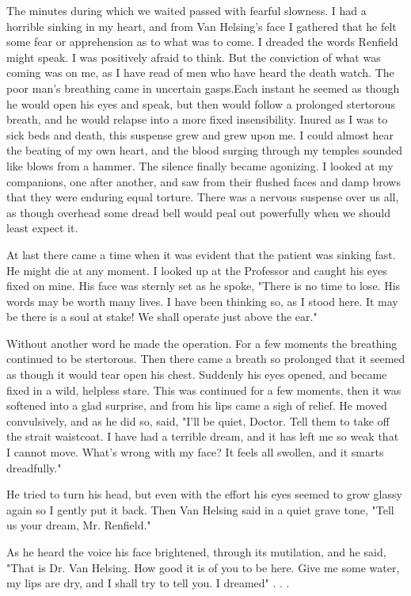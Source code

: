 The minutes during which we waited passed with fearful slowness. I had a horrible sinking in my heart, and from Van Helsing's face I gathered that he felt some fear or apprehension as to what was to come. I dreaded the words Renfield might speak. I was positively afraid to think. But the conviction of what was coming was on me, as I have read of men who have heard the death watch. The poor man's breathing came in uncertain gasps.Each instant he seemed as though he would open his eyes and speak, but then would follow a prolonged stertorous breath, and he would relapse into a more fixed insensibility. Inured as I was to sick beds and death, this suspense grew and grew upon me. I could almost hear the beating of my own heart, and the blood surging through my temples sounded like blows from a hammer. The silence finally became agonizing. I looked at my companions, one after another, and saw from their flushed faces and damp brows that they were enduring equal torture. There was a nervous suspense over us all, as though overhead some dread bell would peal out powerfully when we should least expect it. 

At last there came a time when it was evident that the patient was sinking fast. He might die at any moment. I looked up at the Professor and caught his eyes fixed on mine. His face was sternly set as he spoke, "There is no time to lose. His words may be worth many lives. I have been thinking so, as I stood here. It may be there is a soul at stake! We shall operate just above the ear." 

Without another word he made the operation. For a few moments the breathing continued to be stertorous. Then there came a breath so prolonged that it seemed as though it would tear open his chest. Suddenly his eyes opened, and became fixed in a wild, helpless stare. This was continued for a few moments, then it was softened into a glad surprise, and from his lips came a sigh of relief. He moved convulsively, and as he did so, said, "I'll be quiet, Doctor. Tell them to take off the strait waistcoat. I have had a terrible dream, and it has left me so weak that I cannot move. What's wrong with my face? It feels all swollen, and it smarts dreadfully." 

He tried to turn his head, but even with the effort his eyes seemed to grow glassy again so I gently put it back. Then Van Helsing said in a quiet grave tone, "Tell us your dream, Mr. Renfield." 

As he heard the voice his face brightened, through its mutilation, and he said, "That is Dr. Van Helsing. How good it is of you to be here. Give me some water, my lips are dry, and I shall try to tell you. I dreamed" . . . 

